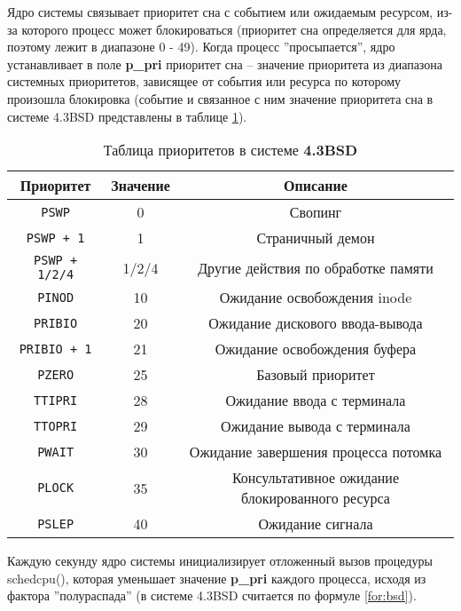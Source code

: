 \documentclass[a4paper,14pt,russian]{extreport}
\begin{document}
	Ядро системы связывает приоритет сна с событием или ожидаемым ресурсом, из-за которого процесс может блокироваться (приоритет сна определяется для ярда, поэтому лежит в диапазоне 0 - 49).
	Когда процесс ”просыпается”, ядро устанавливает в поле \textbf{p\_pri} приоритет сна – значение приоритета из диапазона системных приоритетов, зависящее от события или ресурса по которому произошла блокировка (событие и связанное с ним значение приоритета сна в системе 4.3BSD представлены в таблице \ref{tab:bsd}).
	
	\begin{table}[h]
		\caption{Таблица приоритетов в системе \textbf{4.3BSD}}
		\label{tab:bsd}
		\begin{center}
			\begin{tabular}{ |c|c|c|  }
				\hline
				\textbf{Приоритет} & \textbf{Значение} & \textbf{Описание} \\
				\hline
				\texttt{PSWP} & 0 & Свопинг \\
				\hline
				\texttt{PSWP + 1} & 1 & Страничный демон \\
				\hline
				\texttt{PSWP + 1/2/4} & 1/2/4 & Другие действия по обработке памяти \\
				\hline
				\texttt{PINOD} & 10 & Ожидание освобождения inode \\
				\hline
				\texttt{PRIBIO} & 20 & Ожидание дискового ввода-вывода \\
				\hline
				\texttt{PRIBIO + 1} & 21 & Ожидание освобождения буфера \\
				\hline
				\texttt{PZERO} & 25 & Базовый приоритет \\
				\hline
				\texttt{TTIPRI} & 28 & Ожидание ввода с терминала \\
				\hline
				\texttt{TTOPRI} & 29 & Ожидание вывода с терминала \\
				\hline 
				\texttt{PWAIT} & 30 & Ожидание завершения процесса потомка \\
				\hline
				\texttt{PLOCK} & 35 & Консультативное ожидание блокированного ресурса \\
				\hline
				\texttt{PSLEP} & 40 & Ожидание сигнала \\
				\hline
			\end{tabular}
		\end{center}
	\end{table}
	
	Каждую секунду ядро системы инициализирует отложенный вызов процедуры schedcpu(), которая уменьшает значение \textbf{p\_pri} каждого процесса, исходя из фактора ”полураспада” (в системе 4.3BSD считается по формуле \ref{for:bsd}).
	
\end{document}
